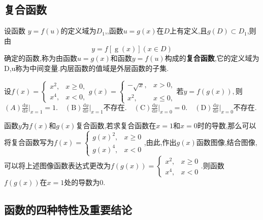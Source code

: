 \documentclass[12pt, a4paper, oneside, UTF8]{ctexbook}  %
\begin{document}
\begin{sloppypar}
    \subsection{复合函数}
    设函数 $y=f(u)$的定义域为$D_1$,,函数$u=g(x)$在$D$上有定义,且$g(D) \subset D_1$,则由
    $$
        y=f[\operatorname{g}(x)](x{\in}D)
    $$
    确定的函数,称为由函数$u=g(x)$和函数$y=f(u)$构成的\textbf{复合函数},它的定义域为D,u称为中间变量.内层函数的值域是外层函数的子集.
    \begin{problem}
    $\text{设}f(x)=\begin{cases}x^2,&x\geqslant0,\\x^4,&x<0,\end{cases}g(x)=\begin{cases}-\sqrt{x},&x>0,\\x^2,&x\leqslant0,\end{cases}\text{若}y=f(g(x)),$则
    \newline
    $(A)\frac{\mathrm{d}y}{\mathrm{d}x}\bigg|_{x=1}=1.\quad(\mathrm{B})\frac{\mathrm{d}y}{\mathrm{d}x}\bigg|_{x=1}\text{不存在}.\quad(\mathrm{C})\frac{\mathrm{d}y}{\mathrm{d}x}\bigg|_{x=0}=0.\quad(\mathrm{D})\frac{\mathrm{d}y}{\mathrm{d}x}\bigg|_{x=0}\text{不存在}.$
    \end{problem}
    \begin{solution}
        函数$y$为$f(x)$和$g(x)$复合函数,若求复合函数在$x=1$和$x=0$时的导数,那么可以将复合函数写为$f(x)=\begin{cases}g(x)^2,&x \geqslant 0\\g(x)^4,&x<0\end{cases}$,由此,作出$g(x)$函数图像,结合图像,可以将上述图像函数表达式更改为$f(g(x))=\begin{cases}x^2,&x\geqslant0\\x^4,&x<0\end{cases}$.则函数$f(g(x))$在$x=1$处的导数为0.
    \end{solution}
    \subsection{函数的四种特性及重要结论}

\end{sloppypar}
\end{document}
